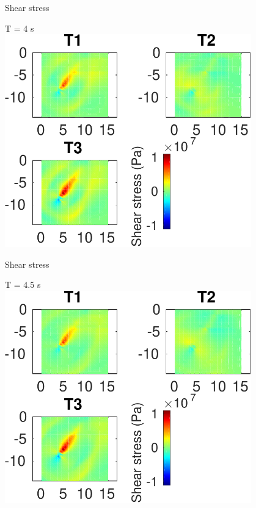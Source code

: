 \documentclass{beamer}
\begin{document}
\begin{frame}
 {Shear stress}
 
 \centering \Large T = 4 s\\
 \includegraphics[width=0.8\textwidth]{images/vertical_00046}
 
\end{frame}

\begin{frame}
 {Shear stress}
 
 \centering \Large T = 4.5 s\\
 \includegraphics[width=0.8\textwidth]{images/vertical_00051}
 
\end{frame}
\end{document}
